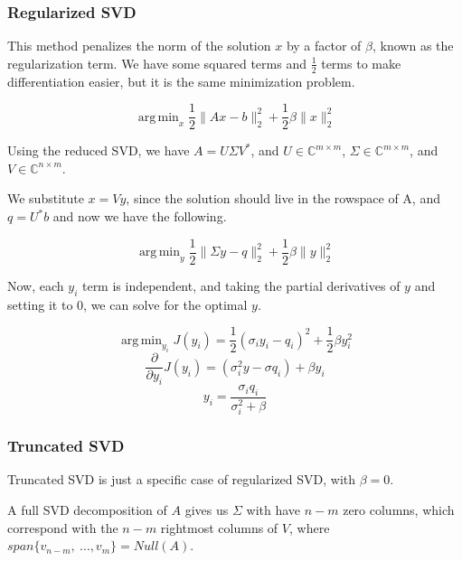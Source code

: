 \documentclass{article}
\theoremstyle{definition}
\DeclareMathOperator*{\argmin}{arg\,min}
\begin{document}
\subsubsection{Regularized SVD}

This method penalizes the norm of the solution $x$ by a factor of $\beta$, known as the regularization term. We have some squared terms and $\frac{1}{2}$ terms to make differentiation easier, but it is the same minimization problem.

\begin{equation}
    \argmin_x \frac{1}{2}\|Ax - b\|_2^2 + \frac{1}{2} \beta \|x\|_2^2
\end{equation}

Using the reduced SVD, we have $A = U \Sigma V^*$, and $U \in \mathbb{C}^{m \times m}$, $\Sigma \in \mathbb{C}^{m \times m}$, and $V \in \mathbb{C}^{n \times m}$.

We substitute $x = V y$, since the solution should live in the rowspace of A, and $q = U^* b$ and now we have the following.

\begin{equation}
    \argmin_y \frac{1}{2}\|\Sigma y - q\|_2^2 + \frac{1}{2} \beta \|y\|_2^2
\end{equation}

Now, each $y_i$ term is independent, and taking the partial derivatives of $y$ and setting it to $0$, we can solve for the optimal $y$.

\begin{equation}
    \argmin_{y_i} J(y_i) = \frac{1}{2} (\sigma_i y_i - q_i)^2 + \frac{1}{2} \beta y_i^2
\end{equation}
\begin{equation}
    \frac{\partial}{\partial y_i} J(y_i) = (\sigma_i^2 y - \sigma q_i) + \beta y_i
\end{equation}
\begin{equation}
    y_i = \frac{\sigma_i q_i}{\sigma_i^2 + \beta}
\end{equation}

\subsubsection{Truncated SVD}

Truncated SVD is just a specific case of regularized SVD, with $\beta = 0$.

A full SVD decomposition of $A$ gives us $\Sigma$ with have $n-m$ zero columns, which correspond with the $n - m$ rightmost columns of $V$, where $span\{v_{n-m},\ \dots, v_m\} = Null(A)$.
\end{document}
